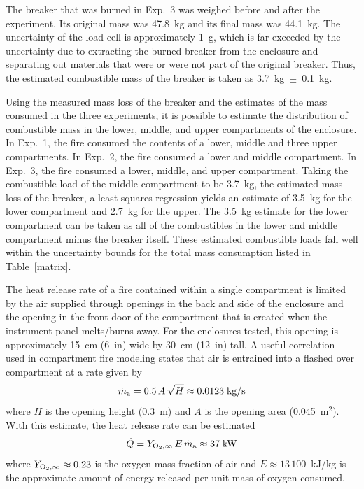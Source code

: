 \documentclass[12pt]{article}
\begin{document}
The breaker that was burned in Exp.~3 was weighed before and after the experiment. Its original mass was 47.8~kg and its final mass was 44.1~kg. The uncertainty of the load cell is approximately 1~g, which is far exceeded by the uncertainty due to extracting the burned breaker from the enclosure and separating out materials that were or were not part of the original breaker. Thus, the estimated combustible mass of the breaker is taken as 3.7~kg~$\pm$~0.1~kg.

Using the measured mass loss of the breaker and the estimates of the mass consumed in the three experiments, it is possible to estimate the distribution of combustible mass in the lower, middle, and upper compartments of the enclosure. In Exp.~1, the fire consumed the contents of a lower, middle and three upper compartments. In Exp.~2, the fire consumed a lower and middle compartment. In Exp.~3, the fire consumed a lower, middle, and upper compartment. Taking the combustible load of the middle compartment to be 3.7~kg, the estimated mass loss of the breaker, a least squares regression yields an estimate of 3.5~kg for the lower compartment and 2.7~kg for the upper. The 3.5~kg estimate for the lower compartment can be taken as all of the combustibles in the lower and middle compartment minus the breaker itself. These estimated combustible loads fall well within the uncertainty bounds for the total mass consumption listed in Table~\ref{matrix}.

The heat release rate of a fire contained within a single compartment is limited by the air supplied through openings in the back and side of the enclosure and the opening in the front door of the compartment that is created when the instrument panel melts/burns away. For the enclosures tested, this opening is approximately 15~cm (6~in) wide by 30~cm (12~in) tall. A useful correlation~\cite{SFPE:Walton} used in compartment fire modeling states that air is entrained into a flashed over compartment at a rate given by
\begin{equation}
   \dot{m}_{\rm a} = 0.5  \, A \, \sqrt{H}  \approx 0.0123 \; \hbox{kg/s}
\end{equation}
where $H$ is the opening height (0.3~m) and $A$ is the opening area (0.045~m$^2$). With this estimate, the heat release rate can be estimated
\begin{equation}
   \dot{Q} = Y_{\rm O_2,\infty} \, E \, \dot{m}_{\rm a} \approx 37 \; \hbox{kW}
\end{equation}
where $Y_{\rm O_2,\infty}\approx 0.23$ is the oxygen mass fraction of air and $E\approx 13\,100$~kJ/kg is the approximate amount of energy released per unit mass of oxygen consumed.
\end{document}
